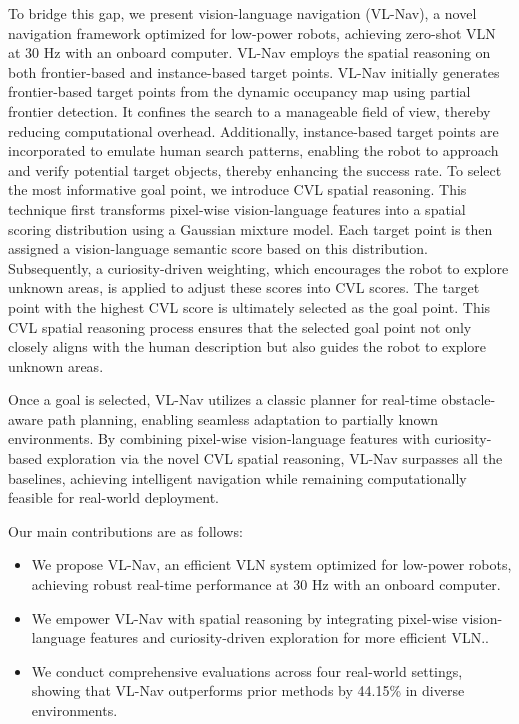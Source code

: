 To bridge this gap, we present vision-language navigation (VL-Nav), a novel navigation framework optimized for low-power robots, achieving zero-shot VLN at 30 Hz with an onboard computer. VL-Nav employs the spatial reasoning on both frontier-based and instance-based target points.
VL-Nav initially generates frontier-based target points from the dynamic occupancy map using partial frontier detection. 
It confines the search to a manageable field of view, thereby reducing computational overhead. 
Additionally, instance-based target points are incorporated to emulate human search patterns, enabling the robot to approach and verify potential target objects, thereby enhancing the success rate. 
To select the most informative goal point, we introduce CVL spatial reasoning. 
This technique first transforms pixel-wise vision-language features into a spatial scoring distribution using a Gaussian mixture model. Each target point is then assigned a vision-language semantic score based on this distribution. Subsequently, a curiosity-driven weighting, which encourages the robot to explore unknown areas, is applied to adjust these scores into CVL scores. 
The target point with the highest CVL score is ultimately selected as the goal point. This CVL spatial reasoning process ensures that the selected goal point not only closely aligns with the human description but also guides the robot to explore unknown areas.

Once a goal is selected, VL-Nav utilizes a classic planner for real-time obstacle-aware path planning, enabling seamless adaptation to partially known environments. By combining pixel-wise vision-language features with curiosity-based exploration via the novel CVL spatial reasoning, VL-Nav surpasses all the baselines, achieving intelligent navigation while remaining computationally feasible for real-world deployment.

Our main contributions are as follows:
\begin{itemize}
    \item 
    We propose VL-Nav, an efficient VLN system optimized for low-power robots, achieving robust real-time performance at 30 Hz with an onboard computer.
    \item 
    We empower VL-Nav with spatial reasoning by integrating pixel-wise vision-language features and curiosity-driven exploration for more efficient VLN..
    \item 
    We conduct comprehensive evaluations across four real-world settings, showing that VL-Nav outperforms prior methods by 44.15\% in diverse environments.
\end{itemize}
